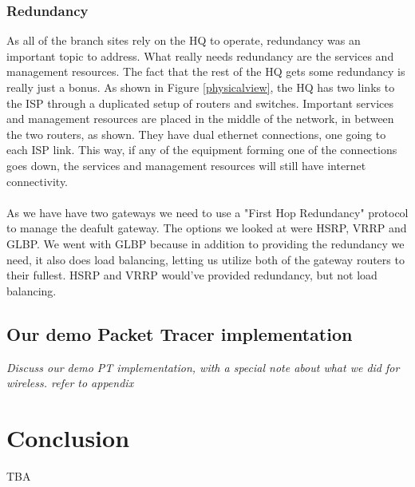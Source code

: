 
\subsubsection{Redundancy}

As all of the branch sites rely on the HQ to operate, redundancy was an important topic to address. What really needs redundancy are the services and management resources. The fact that the rest of the HQ gets some redundancy is really just a bonus. As shown in Figure \ref{physicalview}, the HQ has two links to the ISP through a duplicated setup of routers and switches. Important services and management resources are placed in the middle of the network, in between the two routers, as shown. They have dual ethernet connections, one going to each ISP link. This way, if any of the equipment forming one of the connections goes down, the services and management resources will still have internet connectivity.
\\
\\
As we have have two gateways we need to use a "First Hop Redundancy" protocol to manage the deafult gateway. The options we looked at were HSRP, VRRP and GLBP. We went with GLBP because in addition to providing the redundancy we need, it also does load balancing, letting us utilize both of the gateway routers to their fullest. HSRP and VRRP would've provided redundancy, but not load balancing.




\subsection{Our demo Packet Tracer implementation}

\textit{Discuss our demo PT implementation, with a special note about what we did for wireless. refer to appendix}

\clearpage

\section{Conclusion}
TBA


\clearpage %

\nocite{*}





\clearpage %
\appendix


